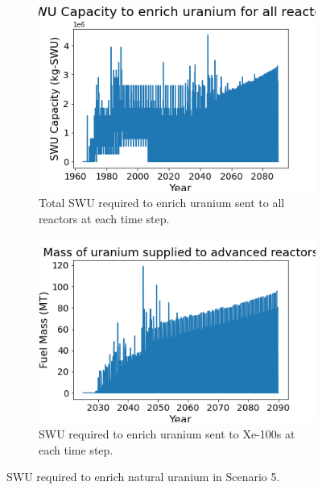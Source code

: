 \begin{figure}
    \centering
    \begin{subfigure}{0.4\textwidth}
        \centering
        \includegraphics[scale=0.3]{figures/totalswu_scenarios_5.png}
        \caption{Total \gls{SWU} required to enrich uranium sent to all reactors at each time step.}
        \label{fig:totalswu_5}
    \end{subfigure}
    \begin{subfigure}{0.4\textwidth}
        \centering
        \includegraphics[scale=0.3]{figures/advancedRX_fuelsupply_scenarios_5.png}
        \caption{\gls{SWU} required to enrich uranium sent to Xe-100s at each time step.}
        \label{fig:haleuswu_5}
    \end{subfigure}
    \caption{\gls{SWU} required to enrich natural uranium in Scenario 5.}
    \label{fig:swu_5}
\end{figure}
